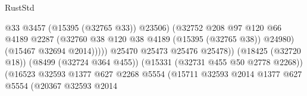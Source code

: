 \begin{lexlean}{RustStd}
\begin{coremodule}
                                                            @33
                                                            @3457
                                                            (@15395 (@32765 @33))
                                                            @23506)
                                                          (@32752
                                                            @208
                                                            @97
                                                            @120
                                                            @66
                                                            @4189
                                                            @2287
                                                            (@32760
                                                              @38
                                                              @120
                                                              @38
                                                              @4189
                                                              (@15395 (@32765 @38))
                                                              @24980)
                                                            (@15467 @32694 @2014)))))
                                                    @25470
                                                    @25473
                                                    @25476
                                                    @25478))
                                                (@18425 (@32720 @18))
                                                (@8499 (@32724 @364 @455))
                                                (@15331 (@32731 @455 @50 @2778 @2268))
                                                (@16523
                                                  @32593
                                                  @1377
                                                  @627
                                                  @2268
                                                  @5554
                                                  (@15711
                                                    @32593
                                                    @2014
                                                    @1377
                                                    @627
                                                    @5554
                                                    (@20367
                                                      @32593
                                                      @2014

\end{coremodule}
\end{lexlean}
